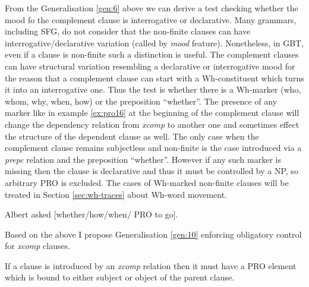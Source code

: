     From the Generalisation \ref{gen:6} above we can derive a test checking whether the mood fo the complement clause is interrogative or declarative. Many grammars, including SFG, do not consider that the non-finite clauses can have interrogative/declarative variation (called by \citet[107-167]{Halliday2004} \textit{mood} feature). Nonetheless, in GBT, even if a clause is non-finite such a distinction is useful. The complement clauses can have structural variation resembling a declarative or interrogative mood for the reason that a complement clause can start with a Wh-constituent which turns it into an interrogative one. Thus the test is whether there is a Wh-marker (who, whom, why, when, how) or the preposition ``whether''. The presence of any marker like in example \ref{ex:pro16} at the beginning of the complement clause will change the dependency relation from \textit{xcomp} to another one and sometimes effect the structure of the dependent clause as well. The only case when the complement clause remains subjectless and non-finite is the case introduced via a \textit{prepc} relation and the preposition ``whether''. However if any such marker is missing then the clause is declarative and thus it must be controlled by a NP, so arbitrary PRO is excluded. The cases of Wh-marked non-finite clauses will be treated in Section \ref{sec:wh-traces} about Wh-word movement.

    \begin{exe}
    	\ex \label{ex:pro16}Albert asked [whether/how/when/ PRO to go].
    \end{exe}
    
    Based on the above I propose Generalisation \ref{gen:10} enforcing obligatory control for \textit{xcomp} clauses.

    
    \begin{generalization}\label{gen:10}
    	If a clause is introduced by an \textit{xcomp} relation then it must have a PRO element which is bound to either subject or object of the parent clause.
    \end{generalization}

